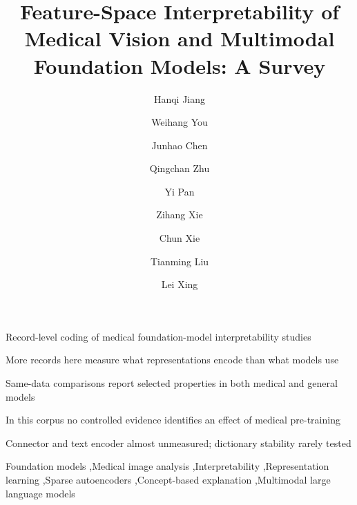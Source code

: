 \documentclass[final,3p,times,twocolumn,number,sort, compress]{elsarticle}
\begin{document}
\begin{frontmatter}

\title{Feature-Space Interpretability of Medical Vision and Multimodal Foundation Models: A Survey}

\author[uga,stan]{Hanqi Jiang}
\author[uga]{Weihang You}
\author[uga]{Junhao Chen}
\author[uga]{Qingchan Zhu}
\author[uga]{Yi Pan}
\author[jp]{Zihang Xie}
\author[jp]{Chun Xie}
\author[uga]{Tianming Liu}
\author[stan]{Lei Xing}



\begin{abstract}

\end{abstract}

\begin{highlights}
\item Record-level coding of \Ncore{} medical foundation-model interpretability studies
\item More records here measure what representations encode than what models use
\item Same-data comparisons report selected properties in both medical and general models
\item In this corpus no controlled evidence identifies an effect of medical pre-training
\item Connector and text encoder almost unmeasured; dictionary stability rarely tested
\end{highlights}
\hypersetup{pageanchor=true}

\begin{keyword}
Foundation models \sep Medical image analysis \sep Interpretability \sep Representation learning \sep Sparse autoencoders \sep Concept-based explanation \sep Multimodal large language models
\end{keyword}

\end{frontmatter}
\end{document}
